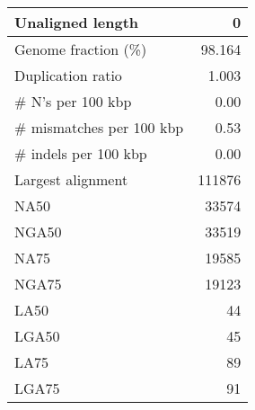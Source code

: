 \documentclass[12pt,a4paper]{article}
\begin{document}
\begin{table}[ht]
\begin{center}
\begin{tabular}{|l*{1}{|r}|}
Unaligned length & 0 \\ \hline
Genome fraction (\%) & 98.164 \\ \hline
Duplication ratio & 1.003 \\ \hline
\# N's per 100 kbp & 0.00 \\ \hline
\# mismatches per 100 kbp & 0.53 \\ \hline
\# indels per 100 kbp & 0.00 \\ \hline
Largest alignment & 111876 \\ \hline
NA50 & 33574 \\ \hline
NGA50 & 33519 \\ \hline
NA75 & 19585 \\ \hline
NGA75 & 19123 \\ \hline
LA50 & 44 \\ \hline
LGA50 & 45 \\ \hline
LA75 & 89 \\ \hline
LGA75 & 91 \\ \hline
\end{tabular}
\end{center}
\end{table}
\end{document}
